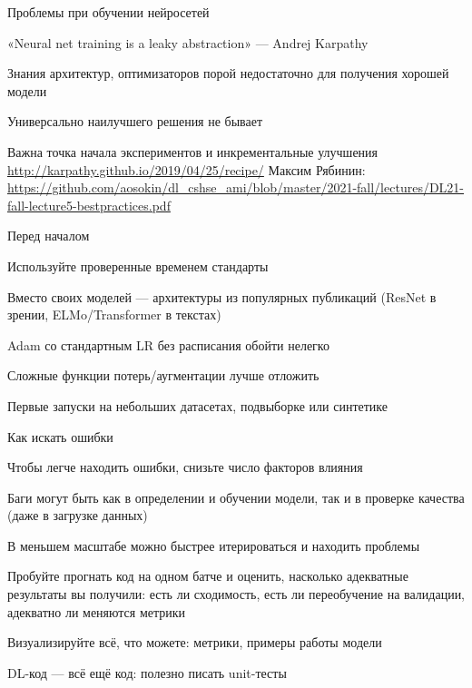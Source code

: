 \documentclass[notes,12pt, aspectratio=169]{beamer}
\newenvironment{wideitemize}{\itemize\addtolength{\itemsep}{10pt}}{\enditemize}
\begin{document}
\begin{frame}{Проблемы при обучении нейросетей}
\begin{wideitemize}
	\item  «Neural net training is a leaky abstraction» — Andrej Karpathy
	\item  Знания архитектур, оптимизаторов порой недостаточно для получения хорошей модели
	\item Универсально наилучшего решения не бывает
	\item Важна точка начала экспериментов и инкрементальные улучшения
\end{wideitemize}
\vfill
\footnotesize
{\color{blue} \url{http://karpathy.github.io/2019/04/25/recipe/} \newline Максим Рябинин: \url{https://github.com/aosokin/dl_cshse_ami/blob/master/2021-fall/lectures/DL21-fall-lecture5-bestpractices.pdf} }
\end{frame}


\begin{frame}{Перед началом}
	\begin{wideitemize}
		\item  Используйте проверенные временем стандарты
		\item  Вместо своих моделей — архитектуры из популярных публикаций  (ResNet в зрении, ELMo/Transformer в текстах)
		\item Adam со стандартным LR без расписания обойти нелегко
		\item Сложные функции потерь/аугментации лучше отложить
		\item Первые запуски на небольших датасетах, подвыборке или синтетике
	\end{wideitemize}
\end{frame}


\begin{frame}{Как искать ошибки}
	\begin{wideitemize}	
		\item Чтобы легче находить ошибки, снизьте число факторов влияния 
		
		\item  Баги могут быть как в определении и обучении модели, так и в проверке качества (даже в загрузке данных)
		
		\item В меньшем масштабе можно быстрее итерироваться и находить проблемы
		
		\item \alert{Пробуйте прогнать код на одном батче и оценить, насколько адекватные результаты вы получили:} есть ли сходимость, есть ли переобучение на валидации, адекватно ли меняются метрики 
		
		\item Визуализируйте всё, что можете: метрики, примеры работы модели
		
		\item DL-код — всё ещё код: полезно писать unit-тесты
	\end{wideitemize}
\end{frame}
\end{document}
